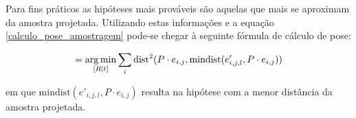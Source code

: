 Para fins práticos as hipóteses mais prováveis são aquelas que mais se aproximam da amostra projetada. Utilizando estas informações e a equação \eqref{calculo_pose_amostragem} pode-se chegar à seguinte fórmula de cálculo de pose:

\begin{equation}
[R | t] = \argmin_{[R | t]} \sum_i \text{dist}^2(P \cdot e_{i,j}, \text{mindist}(e'_{i,j,l}, P \cdot e_{i,j}))
\end{equation}

\noindent
em que $\text{mindist}(e'_{i,j,l}, P \cdot e_{i,j})$ resulta na hipótese com a menor distância da amostra projetada.

